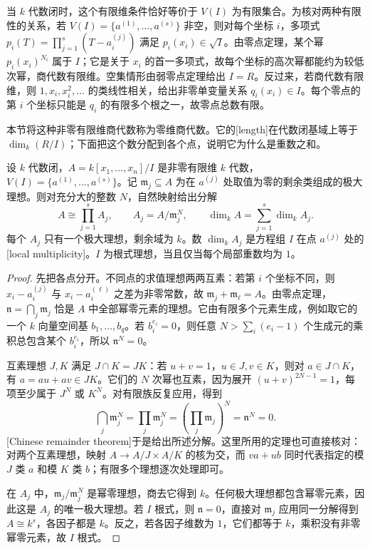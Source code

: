 当 \(k\) 代数闭时，这个有限维条件恰好等价于 \(V(I)\) 为有限集合。为核对两种有限性的关系，若 \(V(I)=\{a^{(1)},\ldots,a^{(s)}\}\) 非空，则对每个坐标 \(i\)，多项式 \(p_i(T)=\prod_{j=1}^s(T-a_i^{(j)})\) 满足 \(p_i(x_i)\in\sqrt I\)。由零点定理，某个幂 \(p_i(x_i)^{N_i}\) 属于 \(I\)；它是关于 \(x_i\) 的首一多项式，故每个坐标的高次幂都能约为较低次幂，商代数有限维。空集情形由弱零点定理给出 \(I=R\)。反过来，若商代数有限维，则 \(1,x_i,x_i^2,\ldots\) 的类线性相关，给出非零单变量关系 \(q_i(x_i)\in I\)。每个零点的第 \(i\) 个坐标只能是 \(q_i\) 的有限多个根之一，故零点总数有限。

本节将这种非零有限维商代数称为零维商代数。它的[length]在代数闭基域上等于 \(\dim_k(R/I)\)；下面把这个数分配到各个点，说明它为什么是重数之和。

\begin{proposition}\label{g5:prop:finite-algebra-multiplicities}
	设 \(k\) 代数闭，\(A=k[x_1,\ldots,x_n]/I\) 是非零有限维 \(k\) 代数，\(V(I)=\{a^{(1)},\ldots,a^{(s)}\}\)。记 \(\mathfrak m_j\subseteq A\) 为在 \(a^{(j)}\) 处取值为零的剩余类组成的极大理想。则对充分大的整数 \(N\)，自然映射给出分解
	\[
		A\cong\prod_{j=1}^s A_j,\qquad A_j=A/\mathfrak m_j^N,
		\qquad \dim_kA=\sum_{j=1}^s\dim_kA_j.
	\]
	每个 \(A_j\) 只有一个极大理想，剩余域为 \(k\)。数 \(\dim_kA_j\) 是方程组 \(I\) 在点 \(a^{(j)}\) 处的[local multiplicity]。\(I\) 为根式理想，当且仅当每个局部重数均为 \(1\)。
\end{proposition}
\begin{proof}
	先把各点分开。不同点的求值理想两两互素：若第 \(i\) 个坐标不同，则 \(x_i-a_i^{(j)}\) 与 \(x_i-a_i^{(\ell)}\) 之差为非零常数，故 \(\mathfrak m_j+\mathfrak m_\ell=A\)。由零点定理，\(\mathfrak n=\bigcap_j\mathfrak m_j\) 恰是 \(A\) 中全部幂零元素的理想。它由有限多个元素生成，例如取它的一个 \(k\) 向量空间基 \(b_1,\ldots,b_q\)。若 \(b_i^{e_i}=0\)，则任意 \(N>\sum_i(e_i-1)\) 个生成元的乘积总包含某个 \(b_i^{e_i}\)，所以 \(\mathfrak n^N=0\)。

	互素理想 \(J,K\) 满足 \(J\cap K=JK\)：若 \(u+v=1\)，\(u\in J,v\in K\)，则对 \(a\in J\cap K\)，有 \(a=au+av\in JK\)。它们的 \(N\) 次幂也互素，因为展开 \((u+v)^{2N-1}=1\)，每项至少属于 \(J^N\) 或 \(K^N\)。对有限族反复应用，得到
	\[
		\bigcap_j\mathfrak m_j^N
		=\prod_j\mathfrak m_j^N
		=\left(\prod_j\mathfrak m_j\right)^N
		=\mathfrak n^N=0.
	\]
	[Chinese remainder theorem]于是给出所述分解。这里所用的定理也可直接核对：对两个互素理想，映射 \(A\to A/J\times A/K\) 的核为交，而 \(va+ub\) 同时代表指定的模 \(J\) 类 \(a\) 和模 \(K\) 类 \(b\)；有限多个理想逐次处理即可。

	在 \(A_j\) 中，\(\mathfrak m_j/\mathfrak m_j^N\) 是幂零理想，商去它得到 \(k\)。任何极大理想都包含幂零元素，因此这是 \(A_j\) 的唯一极大理想。若 \(I\) 根式，则 \(\mathfrak n=0\)，直接对 \(\mathfrak m_j\) 应用同一分解得到 \(A\cong k^s\)，各因子都是 \(k\)。反之，若各因子维数为 \(1\)，它们都等于 \(k\)，乘积没有非零幂零元素，故 \(I\) 根式。
\end{proof}

